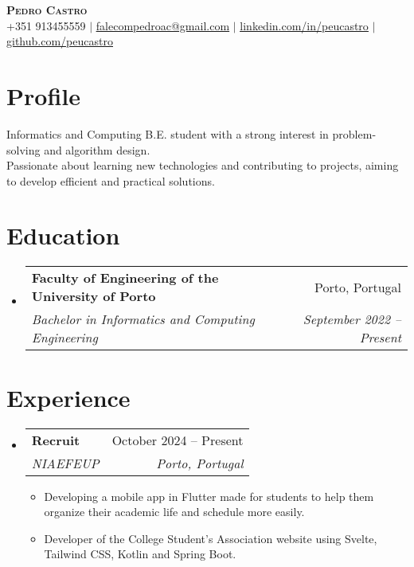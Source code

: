 \documentclass[a4paper,11pt]{article}
\makeatletter
\newcommand{\resumeItem}[1]{
	\item\small{
		{#1 \vspace{-2pt}}
	}
}
\newcommand{\resumeSubheading}[4]{
	\vspace{-2pt}\item
	\begin{tabular*}{0.97\textwidth}[t]{l@{\extracolsep{\fill}}r}
		\textbf{#1} & #2 \\
		\textit{\small#3} & \textit{\small #4} \\
	\end{tabular*}\vspace{-7pt}
}
\newcommand{\resumeSubHeadingListStart}{\begin{itemize}[leftmargin=0.15in, label={}]}
\newcommand{\resumeSubHeadingListEnd}{\end{itemize}}
\newcommand{\resumeItemListStart}{\begin{itemize}}
\newcommand{\resumeItemListEnd}{\end{itemize}\vspace{-5pt}}
\makeatother
\begin{document}
\begin{center}
	\textbf{\Huge \scshape Pedro Castro} \\ \vspace{1pt}
	\small +351 913455559 $|$ \href{mailto:falecompedroac@gmail.com}{\underline{falecompedroac@gmail.com}} $|$
	\href{https://linkedin.com/in/peucastro}{\underline{linkedin.com/in/peucastro}} $|$
	\href{https://github.com/peucastro}{\underline{github.com/peucastro}}
\end{center}

\section{Profile}
\begin{itemize}[leftmargin=0.15in, label={}]
	\small{\item{
	      Informatics and Computing B.E. student with a strong interest in problem-solving and algorithm design. \\
	      Passionate about learning new technologies and contributing to projects, aiming to develop efficient and practical solutions.
	      }}
\end{itemize}

\section{Education}
\resumeSubHeadingListStart%

\resumeSubheading%
{Faculty of Engineering of the University of Porto}{Porto, Portugal}
{Bachelor in Informatics and Computing Engineering}{September 2022 – Present}

\resumeSubHeadingListEnd%

\section{Experience}
\resumeSubHeadingListStart%

\resumeSubheading%
{Recruit}{October 2024 – Present}
{NIAEFEUP}{Porto, Portugal}
\resumeItemListStart%
\resumeItem{Developing a mobile app in Flutter made for students to help them organize their academic life and schedule more easily.}
\resumeItem{Developer of the College Student's Association website using Svelte, Tailwind CSS, Kotlin and Spring Boot.}
\resumeItemListEnd%

\resumeSubHeadingListEnd%
\end{document}
